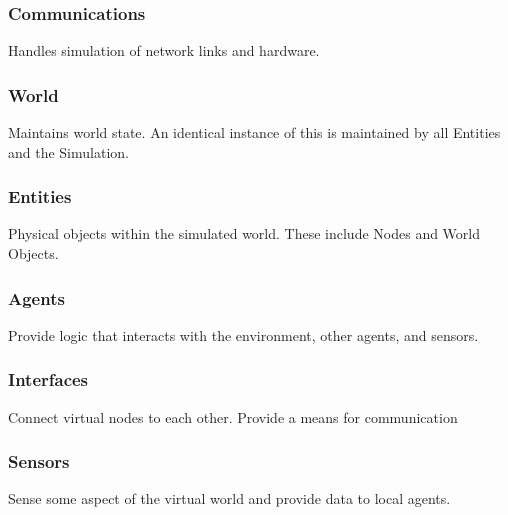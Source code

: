 \documentclass[titlepage]{article}
\begin{document}
\subsubsection{Communications}{Handles simulation of network links and hardware.}
\subsubsection{World}{Maintains world state.  An identical instance of this is maintained by all Entities and the Simulation.}
\subsubsection{Entities}{Physical objects within the simulated world.  These include Nodes and World Objects.}
\subsubsection{Agents}{Provide logic that interacts with the environment, other agents, and sensors.}
\subsubsection{Interfaces}{Connect virtual nodes to each other.  Provide a means for communication}
\subsubsection{Sensors}{Sense some aspect of the virtual world and provide data to local agents.}
\end{document}

